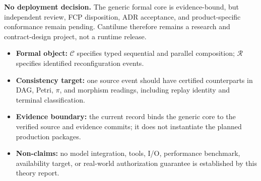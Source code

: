 \begin{MWMetricGrid}
\end{MWMetricGrid}

\begin{MWDecision}
\textbf{No deployment decision.} The generic formal core is evidence-bound, but independent
review, FCP disposition, ADR acceptance, and product-specific conformance remain pending.
Cantilune therefore remains a research and contract-design project, not a runtime release.
\end{MWDecision}

\begin{itemize}
  \item \textbf{Formal object:} \(\mathcal C\) specifies typed sequential and parallel composition;
    \(\mathcal R\) specifies identified reconfiguration events.
  \item \textbf{Consistency target:} one source event should have certified counterparts in DAG,
    Petri, \(\pi\), and morphism readings, including replay identity and terminal classification.
  \item \textbf{Evidence boundary:} the current record binds the generic core to the verified
    source and evidence commits; it does not instantiate the planned production packages.
  \item \textbf{Non-claims:} no model integration, tools, I/O, performance benchmark, availability
    target, or real-world authorization guarantee is established by this theory report.
\end{itemize}

\clearpage
\tableofcontents

\clearpage
\listoffigures
\vspace{8mm}
\listoftables
